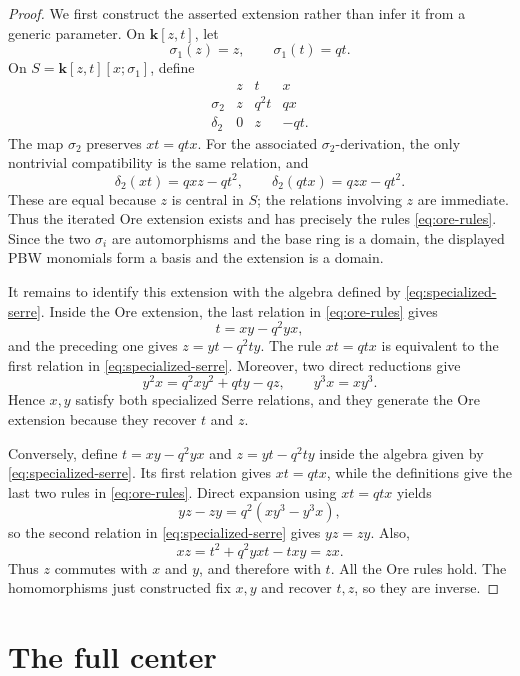 \documentclass[11pt]{article}
\newcommand{\kk}{\mathbf{k}}
\begin{document}
\begin{proof}
We first construct the asserted extension rather than infer it from a generic
parameter.  On $\kk[z,t]$, let
\[
 \sigma_1(z)=z,\qquad \sigma_1(t)=qt.
\]
On $S=\kk[z,t][x;\sigma_1]$, define
\[
 \begin{array}{c|ccc}
       &z&t&x\\ \hline
 \sigma_2&z&q^2t&qx\\
 \delta_2&0&z&-qt.
 \end{array}
\]
The map $\sigma_2$ preserves $xt=qtx$.  For the associated
$\sigma_2$-derivation, the only nontrivial compatibility is the same
relation, and
\[
 \delta_2(xt)=qxz-qt^2,
 \qquad
 \delta_2(qtx)=qzx-qt^2.
\]
These are equal because $z$ is central in $S$; the relations involving $z$
are immediate.  Thus the iterated Ore extension exists and has precisely
the rules \eqref{eq:ore-rules}.  Since the two $\sigma_i$ are automorphisms
and the base ring is a domain, the displayed PBW monomials form a basis and
the extension is a domain.

It remains to identify this extension with the algebra defined by
\eqref{eq:specialized-serre}.  Inside the Ore extension, the last relation in
\eqref{eq:ore-rules} gives
\[
 t=xy-q^2yx,
\]
and the preceding one gives $z=yt-q^2ty$.  The rule $xt=qtx$ is equivalent
to the first relation in \eqref{eq:specialized-serre}.  Moreover, two direct
reductions give
\[
 y^2x=q^2xy^2+qty-qz,
 \qquad
 y^3x=xy^3.
\]
Hence $x,y$ satisfy both specialized Serre relations, and they generate the
Ore extension because they recover $t$ and $z$.

Conversely, define $t=xy-q^2yx$ and $z=yt-q^2ty$ inside the algebra given by
\eqref{eq:specialized-serre}.  Its first relation gives $xt=qtx$, while the
definitions give the last two rules in \eqref{eq:ore-rules}.  Direct
expansion using $xt=qtx$ yields
\begin{equation}
 yz-zy=q^2(xy^3-y^3x),
 \label{eq:yz}
\end{equation}
so the second relation in \eqref{eq:specialized-serre} gives $yz=zy$.
Also,
\[
 xz=t^2+q^2yxt-txy=zx.
\]
Thus $z$ commutes with $x$ and $y$, and therefore with $t$.  All the Ore
rules hold.  The homomorphisms just constructed fix $x,y$ and recover $t,z$,
so they are inverse.
\end{proof}

\section{The full center}
\end{document}
